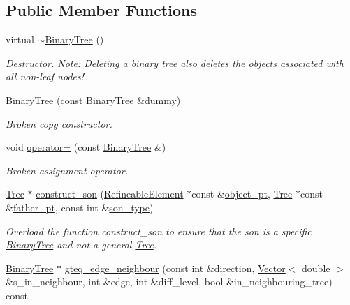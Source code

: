 \subsection*{Public Member Functions}
\begin{DoxyCompactItemize}
\item 
virtual \hyperlink{classoomph_1_1BinaryTree_a782282825e91454e43d79a847cedecf5}{$\sim$\+Binary\+Tree} ()
\begin{DoxyCompactList}\small\item\em Destructor. Note\+: Deleting a binary tree also deletes the objects associated with all non-\/leaf nodes! \end{DoxyCompactList}\item 
\hyperlink{classoomph_1_1BinaryTree_aec7ba886e9b9005b52e6162fab35a5b8}{Binary\+Tree} (const \hyperlink{classoomph_1_1BinaryTree}{Binary\+Tree} \&dummy)
\begin{DoxyCompactList}\small\item\em Broken copy constructor. \end{DoxyCompactList}\item 
void \hyperlink{classoomph_1_1BinaryTree_ad23440beb13ed9207c4489fb744a1d78}{operator=} (const \hyperlink{classoomph_1_1BinaryTree}{Binary\+Tree} \&)
\begin{DoxyCompactList}\small\item\em Broken assignment operator. \end{DoxyCompactList}\item 
\hyperlink{classoomph_1_1Tree}{Tree} $\ast$ \hyperlink{classoomph_1_1BinaryTree_adeb5fdb3cc2b86827622586c42afba37}{construct\+\_\+son} (\hyperlink{classoomph_1_1RefineableElement}{Refineable\+Element} $\ast$const \&\hyperlink{classoomph_1_1Tree_a2f2eeb0f1dd161f696cccc652974ff4c}{object\+\_\+pt}, \hyperlink{classoomph_1_1Tree}{Tree} $\ast$const \&\hyperlink{classoomph_1_1Tree_a5f8444ddeda272b70669b8bbe929708a}{father\+\_\+pt}, const int \&\hyperlink{classoomph_1_1Tree_a7537f8fe7c896d2220eb2da03567b34d}{son\+\_\+type})
\begin{DoxyCompactList}\small\item\em Overload the function construct\+\_\+son to ensure that the son is a specific \hyperlink{classoomph_1_1BinaryTree}{Binary\+Tree} and not a general \hyperlink{classoomph_1_1Tree}{Tree}. \end{DoxyCompactList}\item 
\hyperlink{classoomph_1_1BinaryTree}{Binary\+Tree} $\ast$ \hyperlink{classoomph_1_1BinaryTree_aba768160bad3531d0f62033788619f56}{gteq\+\_\+edge\+\_\+neighbour} (const int \&direction, \hyperlink{classoomph_1_1Vector}{Vector}$<$ double $>$ \&s\+\_\+in\+\_\+neighbour, int \&edge, int \&diff\+\_\+level, bool \&in\+\_\+neighbouring\+\_\+tree) const

\end{DoxyCompactItemize}
